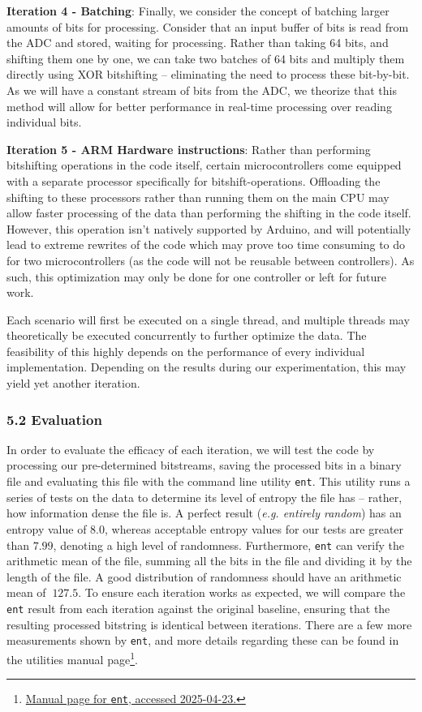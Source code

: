 \textbf{Iteration 4 - Batching}: Finally, we consider the concept of batching larger amounts of bits for processing. Consider that an input buffer of bits is read from the ADC and stored, waiting for processing. Rather than taking 64 bits, and shifting them one by one, we can take two batches of 64 bits and multiply them directly using XOR bitshifting -- eliminating the need to process these bit-by-bit. As we will have a constant stream of bits from the ADC, we theorize that this method will allow for better performance in real-time processing over reading individual bits.

\textbf{Iteration 5 - ARM Hardware instructions}: Rather than performing bitshifting operations in the code itself, certain microcontrollers come equipped with a separate processor specifically for bitshift-operations. Offloading the shifting to these processors rather than running them on the main CPU may allow faster processing of the data than performing the shifting in the code itself. However, this operation isn't natively supported by Arduino, and will potentially lead to extreme rewrites of the code which may prove too time consuming to do for two microcontrollers (as the code will not be reusable between controllers). As such, this optimization may only be done for one controller or left for future work.

Each scenario will first be executed on a single thread, and multiple threads may theoretically be executed concurrently to further optimize the data. The feasibility of this highly depends on the performance of every individual implementation. Depending on the results during our experimentation, this may yield yet another iteration.

\hypertarget{evaluation}{%
\subsubsection{5.2 Evaluation}\label{evaluation}}

In order to evaluate the efficacy of each iteration, we will test the code by processing our pre-determined bitstreams, saving the processed bits in a binary file and evaluating this file with the command line utility \texttt{ent}. This utility runs a series of tests on the data to determine its level of entropy the file has -- rather, how information dense the file is. A perfect result (\emph{e.g. entirely random}) has an entropy value of \(8.0\), whereas acceptable entropy values for our tests are greater than \(7.99\), denoting a high level of randomness. Furthermore, \texttt{ent} can verify the arithmetic mean of the file, summing all the bits in the file and dividing it by the length of the file. A good distribution of randomness should have an arithmetic mean of \(~127.5\). To ensure each iteration works as expected, we will compare the \texttt{ent} result from each iteration against the original baseline, ensuring that the resulting processed bitstring is identical between iterations. There are a few more measurements shown by \texttt{ent}, and more details regarding these can be found in the utilities manual page\footnote{\href{https://manpages.ubuntu.com/manpages/trusty/man1/ent.1.html}{Manual page for \texttt{ent}, accessed 2025-04-23.}}.

